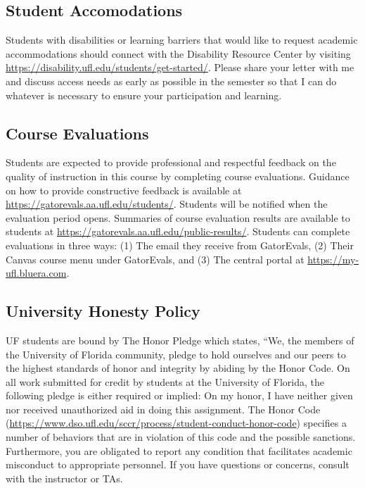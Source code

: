 \documentclass[
  10pt,
  letterpaper,
  oneside,
  open=any]{scrbook}
\begin{document}
\subsection*{Student Accomodations}\label{student-accomodations}

Students with disabilities or learning barriers that would like to
request academic accommodations should connect with the Disability
Resource Center by visiting
\url{https://disability.ufl.edu/students/get-started/}. Please share
your letter with me and discuss access needs as early as possible in the
semester so that I can do whatever is necessary to ensure your
participation and learning.

\subsection*{Course Evaluations}\label{course-evaluations}

Students are expected to provide professional and respectful feedback on
the quality of instruction in this course by completing course
evaluations. Guidance on how to provide constructive feedback is
available at \url{https://gatorevals.aa.ufl.edu/students/}. Students
will be notified when the evaluation period opens. Summaries of course
evaluation results are available to students at
\url{https://gatorevals.aa.ufl.edu/public-results/}. Students can
complete evaluations in three ways: (1) The email they receive from
GatorEvals, (2) Their Canvas course menu under GatorEvals, and (3) The
central portal at \url{https://my-ufl.bluera.com}.

\subsection*{University Honesty Policy}\label{university-honesty-policy}

UF students are bound by The Honor Pledge which states, ``We, the
members of the University of Florida community, pledge to hold ourselves
and our peers to the highest standards of honor and integrity by abiding
by the Honor Code. On all work submitted for credit by students at the
University of Florida, the following pledge is either required or
implied: On my honor, I have neither given nor received unauthorized aid
in doing this assignment. The Honor Code
(\url{https://www.dso.ufl.edu/sccr/process/student-conduct-honor-code})
specifies a number of behaviors that are in violation of this code and
the possible sanctions. Furthermore, you are obligated to report any
condition that facilitates academic misconduct to appropriate personnel.
If you have questions or concerns, consult with the instructor or TAs.
\end{document}
